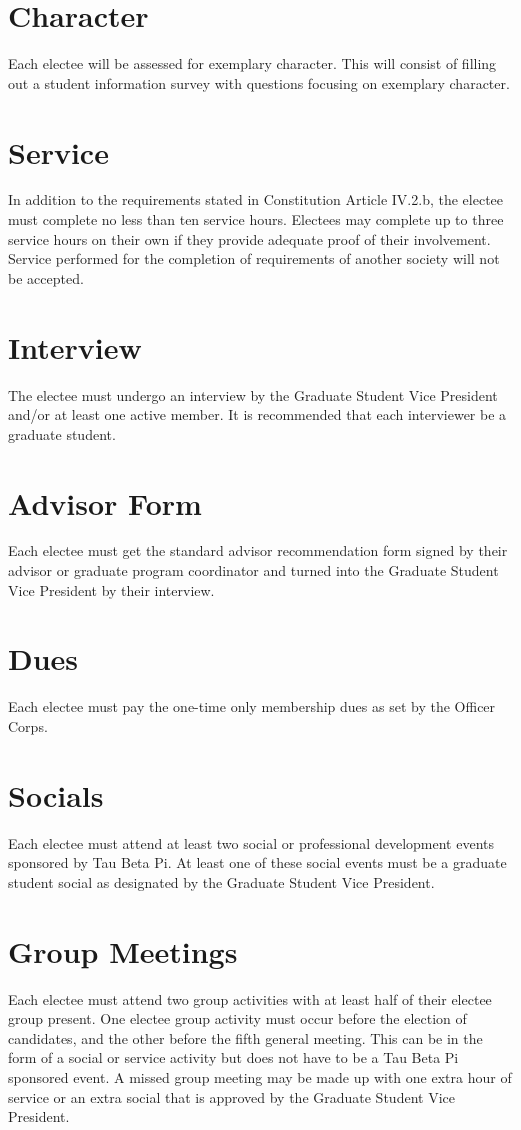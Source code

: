 \section{Character} Each electee will be assessed for exemplary character. This
will consist of filling out a student information survey with questions focusing on exemplary character.
\section{Service}	In addition to the requirements stated in Constitution Article IV.2.b, the electee must complete no less than ten service hours.  Electees may complete up to three service hours on their own if they provide adequate proof of their involvement. Service performed for the completion of requirements of another society will not be accepted.
\section{Interview}	The electee must undergo an interview by the Graduate Student Vice President and/or at least one active member. It is recommended that each interviewer be a graduate student. 
\section{Advisor Form}	Each electee must get the standard advisor recommendation form signed by their advisor or graduate program coordinator and turned into the Graduate Student Vice President by their interview.
\section{Dues}	Each electee must pay the one-time only membership dues as set by the Officer Corps. 
\section{Socials}	Each electee must attend at least two social  or professional development events sponsored by Tau Beta Pi.  At least one of these social events must be a graduate student social as designated by the Graduate Student Vice President.
\section{Group Meetings} \label{grad_group_meetings} Each electee must attend two group activities with at least half of their electee group present. One electee group activity must occur before the election of candidates, and the other before the fifth general meeting. This can be in the form of a social or service activity but does not have to be a Tau Beta Pi sponsored event. A missed group meeting may be made up with one extra hour of service or an extra social that is approved by the Graduate Student Vice President.

